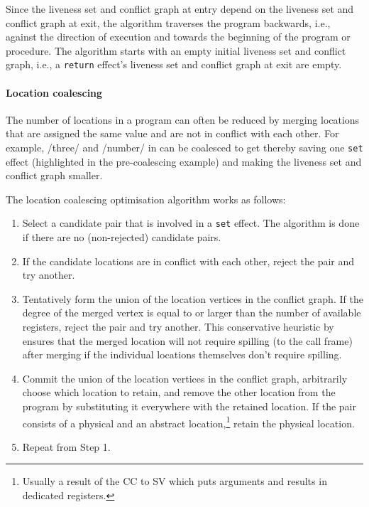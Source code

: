 \documentclass[main.tex]{subfiles}
\begin{document}
Since the liveness set and conflict graph at entry depend on the liveness set and conflict graph at exit, the algorithm traverses the program backwards, i.e., against the direction of execution and towards the beginning of the program or procedure. The algorithm starts with an empty initial liveness set and conflict graph, i.e., a \texttt{return} effect's liveness set and conflict graph at exit are empty.

\paragraph{Location coalescing} The number of locations in a program can often be reduced by merging locations that are assigned the same value and are not in conflict with each other. For example, \iil/three/ and \iil/number/ in
can be coalesced to get
thereby saving one \texttt{set} effect (highlighted in the pre-coalescing example) and making the liveness set and conflict graph smaller.

The location coalescing optimisation algorithm works as follows:
\begin{enumerate}
	\item Select a candidate pair that is involved in a \texttt{set} effect. The algorithm is done if there are no (non-rejected) candidate pairs.
	\item If the candidate locations are in conflict with each other, reject the pair and try another.
	\item Tentatively form the union of the location vertices in the conflict graph. If the degree of the merged vertex is equal to or larger than the number of available registers, reject the pair and try another. This conservative heuristic by \cite{briggs} ensures that the merged location will not require spilling (to the call frame) after merging if the individual locations themselves don't require spilling.
	\item Commit the union of the location vertices in the conflict graph, arbitrarily choose which location to retain, and remove the other location from the program by substituting it everywhere with the retained location. If the pair consists of a physical and an abstract location,\footnote{Usually a result of the CC to SV  which puts arguments and results in dedicated registers.} retain the physical location.
	\item Repeat from Step 1.
\end{enumerate}
\end{document}
